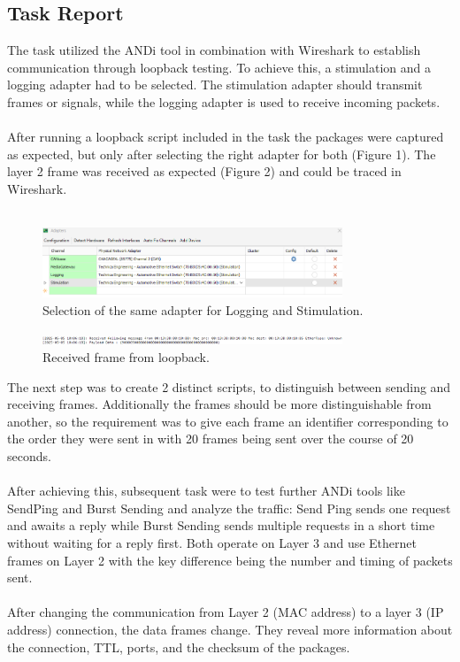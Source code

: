 \subsection{Task Report}
The task utilized the ANDi tool in combination with Wireshark to establish communication through loopback testing. To achieve this, a stimulation and a logging adapter had to be selected. The stimulation adapter should transmit frames or signals, while the logging adapter is used to receive incoming packets.\\\\
After running a loopback script included in the task the packages were captured as expected, but only after selecting the right adapter for both (Figure 1). The layer 2 frame was received as expected (Figure 2) and could be traced in Wireshark.\\\\
\begin{figure}[h]
    \centering
     \includegraphics[width=0.8\textwidth]{figures/pictures/adaptersloopback.png}
    \caption{Selection of the same adapter for Logging and Stimulation.}
    \label{fig:mediagateway_setup}
\end{figure}
\begin{figure}[h]
    \centering
     \includegraphics[width=0.8\textwidth]{figures/pictures/loopbackreceived.png}
    \caption{Received frame from loopback.}
    \label{fig:mediagateway_setup2}
\end{figure}
The next step was to create 2 distinct scripts, to distinguish between sending and receiving frames. Additionally the frames should be more distinguishable from another, so the requirement was to give each frame an identifier corresponding to the order they were sent in with 20 frames being sent over the course of 20 seconds.\\\\
After achieving this, subsequent task were to test further ANDi tools like SendPing and Burst Sending and analyze the traffic: Send Ping sends one request and awaits a reply while Burst Sending sends multiple requests in a short time without waiting for a reply first. Both operate on Layer 3 and use Ethernet frames on Layer 2 with the key difference being the number and timing of packets sent. \\\\
After changing the communication from Layer 2 (MAC address) to a layer 3 (IP address)  connection, the data frames change. They reveal more information about the connection, TTL, ports, and the checksum of the packages. 

